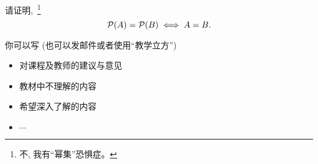\documentclass[a4paper, justified]{tufte-handout}
\begin{document}
\begin{solution}
\end{solution}

\begin{problem}
  请证明,~\footnote{不, 我有``幂集''恐惧症。}
  \[
    \mathcal{P}(A) = \mathcal{P}(B) \iff A = B.
  \]
\end{problem}

\begin{solution}
\end{solution}


\begincorrection

\beginfb

你可以写 (也可以发邮件或者使用``教学立方'')
\begin{itemize}
  \item 对课程及教师的建议与意见
  \item 教材中不理解的内容
  \item 希望深入了解的内容
  \item $\cdots$
\end{itemize}
\end{document}
